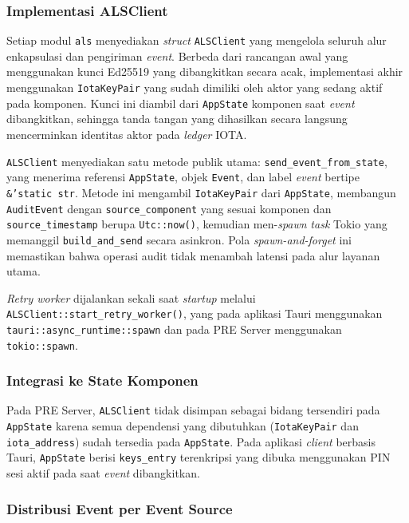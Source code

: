 \subsubsection{Implementasi ALSClient}

Setiap modul \texttt{als} menyediakan \textit{struct} \texttt{ALSClient} yang
mengelola seluruh alur enkapsulasi dan pengiriman \textit{event}. Berbeda dari
rancangan awal yang menggunakan kunci Ed25519 yang dibangkitkan secara acak,
implementasi akhir menggunakan \texttt{IotaKeyPair} yang sudah dimiliki oleh
aktor yang sedang aktif pada komponen. Kunci ini diambil dari \texttt{AppState}
komponen saat \textit{event} dibangkitkan, sehingga tanda tangan yang dihasilkan
secara langsung mencerminkan identitas aktor pada \textit{ledger} IOTA.

\texttt{ALSClient} menyediakan satu metode publik utama:
\texttt{send\_event\_from\_state}, yang menerima referensi \texttt{AppState},
objek \texttt{Event}, dan label \textit{event} bertipe \texttt{\&'static str}.
Metode ini mengambil \texttt{IotaKeyPair} dari \texttt{AppState}, membangun
\texttt{AuditEvent} dengan \texttt{source\_component} yang sesuai komponen dan
\texttt{source\_timestamp} berupa \texttt{Utc::now()}, kemudian men-\textit{spawn}
\textit{task} Tokio yang memanggil \texttt{build\_and\_send} secara asinkron.
Pola \textit{spawn-and-forget} ini memastikan bahwa operasi audit tidak
menambah latensi pada alur layanan utama.

\textit{Retry worker} dijalankan sekali saat \textit{startup} melalui
\texttt{ALSClient::start\_retry\_worker()}, yang pada aplikasi Tauri
menggunakan \texttt{tauri::async\_runtime::spawn} dan pada PRE Server
menggunakan \texttt{tokio::spawn}.

\subsubsection{Integrasi ke State Komponen}

Pada PRE Server, \texttt{ALSClient} tidak disimpan sebagai bidang tersendiri
pada \texttt{AppState} karena semua dependensi yang dibutuhkan (\texttt{IotaKeyPair}
dan \texttt{iota\_address}) sudah tersedia pada \texttt{AppState}. Pada aplikasi
\textit{client} berbasis Tauri, \texttt{AppState} berisi \texttt{keys\_entry}
terenkripsi yang dibuka menggunakan PIN sesi aktif pada saat \textit{event}
dibangkitkan.

\subsubsection{Distribusi Event per Event Source}


